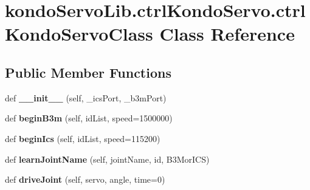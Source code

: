 \hypertarget{classkondoServoLib_1_1ctrlKondoServo_1_1ctrlKondoServoClass}{}\section{kondo\+Servo\+Lib.\+ctrl\+Kondo\+Servo.\+ctrl\+Kondo\+Servo\+Class Class Reference}
\label{classkondoServoLib_1_1ctrlKondoServo_1_1ctrlKondoServoClass}
\subsection*{Public Member Functions}
\begin{DoxyCompactItemize}
\item 
def {\bfseries \+\_\+\+\_\+init\+\_\+\+\_\+} (self, \+\_\+ics\+Port, \+\_\+b3m\+Port)\hypertarget{classkondoServoLib_1_1ctrlKondoServo_1_1ctrlKondoServoClass_a7a6811cf4a66dd452a36dab58726bb86}{}\label{classkondoServoLib_1_1ctrlKondoServo_1_1ctrlKondoServoClass_a7a6811cf4a66dd452a36dab58726bb86}

\item 
def {\bfseries begin\+B3m} (self, id\+List, speed=1500000)\hypertarget{classkondoServoLib_1_1ctrlKondoServo_1_1ctrlKondoServoClass_a6f6de909a0ece5d8b079af5ddc6403ad}{}\label{classkondoServoLib_1_1ctrlKondoServo_1_1ctrlKondoServoClass_a6f6de909a0ece5d8b079af5ddc6403ad}

\item 
def {\bfseries begin\+Ics} (self, id\+List, speed=115200)\hypertarget{classkondoServoLib_1_1ctrlKondoServo_1_1ctrlKondoServoClass_acc8581a2fb8a1f571cc54b01b01f9fda}{}\label{classkondoServoLib_1_1ctrlKondoServo_1_1ctrlKondoServoClass_acc8581a2fb8a1f571cc54b01b01f9fda}

\item 
def {\bfseries learn\+Joint\+Name} (self, joint\+Name, id, B3\+Mor\+I\+CS)\hypertarget{classkondoServoLib_1_1ctrlKondoServo_1_1ctrlKondoServoClass_a816e29c997c82145b828e91b0a3a4a5e}{}\label{classkondoServoLib_1_1ctrlKondoServo_1_1ctrlKondoServoClass_a816e29c997c82145b828e91b0a3a4a5e}

\item 
def {\bfseries drive\+Joint} (self, servo, angle, time=0)\hypertarget{classkondoServoLib_1_1ctrlKondoServo_1_1ctrlKondoServoClass_a624954b797bfbc0029f5f842ebeea54d}{}\label{classkondoServoLib_1_1ctrlKondoServo_1_1ctrlKondoServoClass_a624954b797bfbc0029f5f842ebeea54d}


\end{DoxyCompactItemize}
